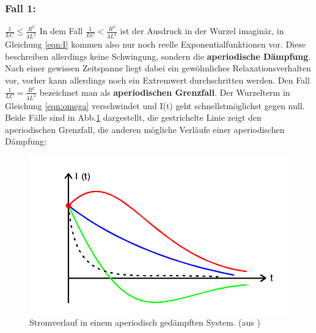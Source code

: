 \subsubsection{Fall 1: }
$\frac{1}{LC} \leq \frac{R^2}{4L^2}$
In dem Fall $\frac{1}{LC}<\frac{R^2}{4L^2}$ ist der Ausdruck in der
Wurzel imaginär, in Gleichung
\ref{eqn:I} kommen also nur noch reelle Exponentialfunktionen vor. Diese
beschreiben allerdings keine Schwingung, sondern die
\textbf{aperiodische Dämpfung}. Nach einer gewissen Zeitspanne liegt dabei ein
gewöhnliches Relaxationsverhalten vor, vorher kann allerdings noch ein Extremwert
durchschritten werden.
Den Fall $\frac{1}{LC}=\frac{R^2}{4L^2}$ bezeichnet man als
\textbf{aperiodischen Grenzfall}. Der Wurzelterm in Gleichung \ref{eqn:omega}
verschwindet und I(t) geht schnellstmöglichst gegen null.
Beide Fälle sind in Abb.\ref{fig:aper} dargestellt, die gestrichelte Linie zeigt
den aperiodischen Grenzfall, die anderen mögliche Verläufe einer aperiodischen
Dämpfung:
\begin{figure}
  \centering
  \includegraphics{aperiode.png}
  \caption{Stromverlauf in einem aperiodisch gedämpften System.
  (aus \cite{protokoll})}
  \label{fig:aper}
\end{figure}

